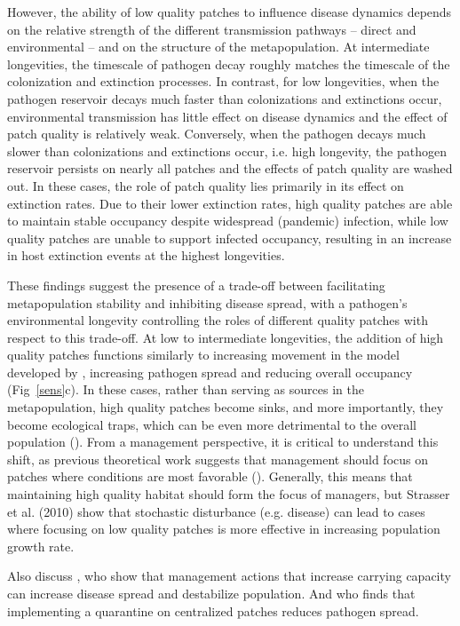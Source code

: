 \documentclass{svjour3}
\begin{document}
However, the ability of low quality patches to influence disease dynamics depends on the relative strength of the different transmission pathways -- direct and environmental -- and on the structure of the metapopulation.  At intermediate longevities, the timescale of pathogen decay roughly matches the timescale of the colonization and extinction processes.  In contrast, for low longevities, when the pathogen reservoir decays much faster than colonizations and extinctions occur, environmental transmission has little effect on disease dynamics and the effect of patch quality is relatively weak.  Conversely, when the pathogen decays much slower than colonizations and extinctions occur, i.e. high longevity, the pathogen reservoir persists on nearly all patches and the effects of patch quality are washed out.  In these cases, the role of patch quality lies primarily in its effect on extinction rates.  Due to their lower extinction rates, high quality patches are able to maintain stable occupancy despite widespread (pandemic) infection, while low quality patches are unable to support infected occupancy, resulting in an increase in host extinction events at the highest longevities.

These findings suggest the presence of a trade-off between facilitating metapopulation stability and inhibiting disease spread, with a pathogen's environmental longevity controlling the roles of different quality patches with respect to this trade-off.  At low to intermediate longevities, the addition of high quality patches functions similarly to increasing movement in the model developed by \cite{Hess1996}, increasing pathogen spread and reducing overall occupancy (Fig~\ref{sens}c).  In these cases, rather than serving as sources in the metapopulation, high quality patches  become sinks, and more importantly, they become ecological traps, which can be even more detrimental to the overall population (\cite{Kristan2003}).  From a management perspective, it is critical to understand this shift, as previous theoretical work suggests that management should focus on patches where conditions are most favorable (\cite{Strasser2010}).  Generally, this means that maintaining high quality habitat should form the focus of managers, but Strasser et al. (2010) show that stochastic disturbance (e.g. disease) can lead to cases where focusing on low quality patches is more effective in increasing population growth rate.

Also discuss \cite{Sharp2011}, who show that management actions that increase carrying capacity can increase disease spread and destabilize population.  And \cite{Hess1996} who finds that implementing a quarantine on centralized patches reduces pathogen spread.
\end{document}
